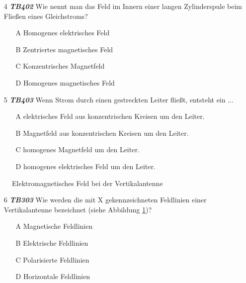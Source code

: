 \begin{enumerate} 
\itemsep1pt\parskip0pt
\item[4] \emph{\textbf{TB402}} Wie nennt man das Feld im Innern einer langen Zylinderspule beim Fließen eines Gleichstroms?\\

	\begin{enumerate}
	\itemsep1pt\parskip0pt
		\item[A] Homogenes elektrisches Feld
		\item[B] Zentriertes magnetisches Feld
		\item[C] Konzentrisches Magnetfeld
		\item[D] Homogenes magnetisches Feld
	\end{enumerate}
\end{enumerate}


\begin{enumerate} 
\itemsep1pt\parskip0pt
\item[5] \emph{\textbf{TB403}} Wenn Strom durch einen gestreckten Leiter fließt, entsteht ein ...\\ 
	\begin{enumerate}
	\itemsep1pt\parskip0pt
		\item[A] elektrisches Feld aus konzentrischen Kreisen um den Leiter.
		\item[B] Magnetfeld aus konzentrischen Kreisen um den Leiter.
		\item[C] homogenes Magnetfeld um den Leiter.
		\item[D] homogenes elektrisches Feld um den Leiter.
	\end{enumerate}
\end{enumerate}

\begin{figure}[H]
\centering

\caption{Elektromagnetisches Feld bei der Vertikalantenne}
\label{AntSchwingkreis_02}
\end{figure}

\begin{enumerate} 
\itemsep1pt\parskip0pt
\item[6] \emph{\textbf{TB303}} Wie werden die mit X gekennzeichneten Feldlinien einer Vertikalantenne bezeichnet (siehe Abbildung \ref{AntSchwingkreis_02})?
	\begin{enumerate}
	\itemsep1pt\parskip0pt
		\item[A] Magnetische Feldlinien
		\item[B] Elektrische Feldlinien
		\item[C] Polarisierte Feldlinien
		\item[D] Horizontale Feldlinien
	\end{enumerate}
\end{enumerate}


